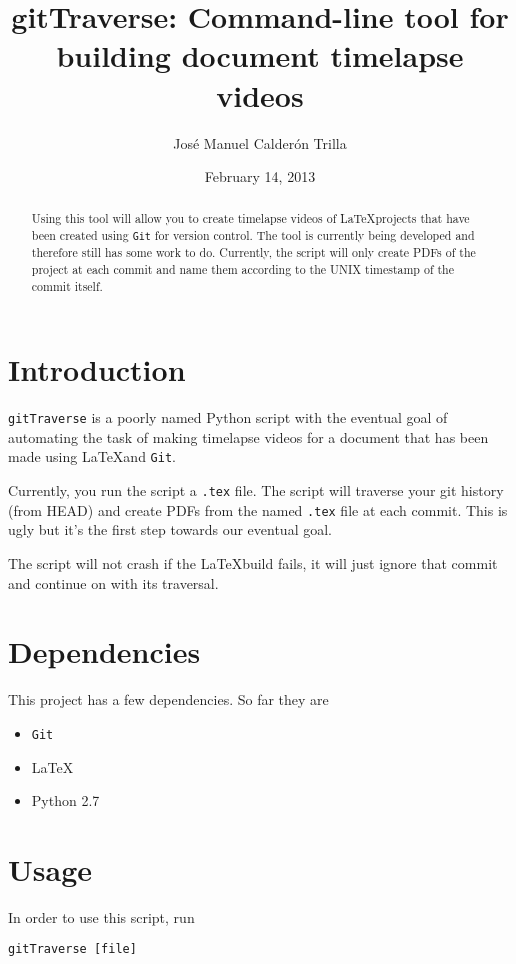 \documentclass{article}
\title{gitTraverse: Command-line tool for building document timelapse videos}
\author{Jos\'{e} Manuel Calder\'{o}n Trilla}
\date{February 14, 2013}
\begin{document}
\maketitle

\begin{abstract}
Using this tool will allow you to create timelapse videos of \LaTeX projects
that have been created using \verb=Git= for version control. The tool is
currently being developed and therefore still has some work to do. Currently,
the script will only create PDFs of the project at each commit and name them
according to the UNIX timestamp of the commit itself. 
\end{abstract}

\section{Introduction}
\verb=gitTraverse= is a poorly named Python script with the eventual goal of automating
the task of making timelapse videos for a document that has been made using \LaTeX and
\verb=Git=.

Currently, you run the script a \verb=.tex= file. The script will traverse your git 
history (from HEAD) and create PDFs from the named \verb=.tex= file at
each commit. This is ugly but it's the first step towards our eventual goal.

The script will not crash if the \LaTeX build fails, it will just ignore that
commit and continue on with its traversal.

\newpage
\section{Dependencies}
This project has a few dependencies. So far they are

    \begin{itemize}
        \item \verb=Git=
        \item \LaTeX
        \item Python 2.7
    \end{itemize}


\newpage
\section{Usage}
In order to use this script, run
\begin{verbatim}
gitTraverse [file]
\end{verbatim}
\end{document}
